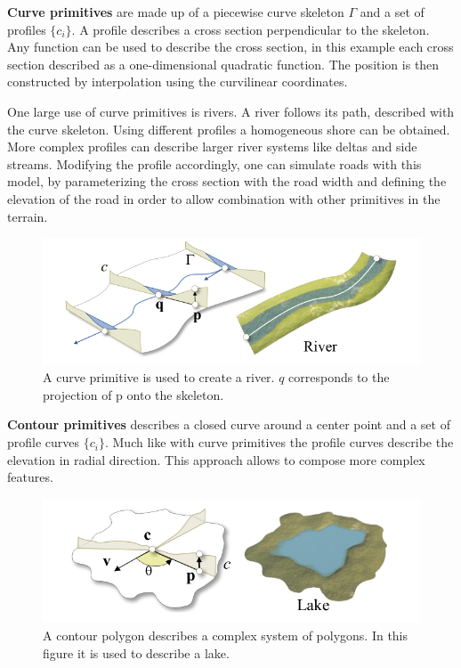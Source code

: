 \textbf{Curve primitives} are made up of a piecewise curve skeleton  $\Gamma$ and a set of profiles $\{c_i\}$. A profile describes a cross section perpendicular to the skeleton. Any function can be used to describe the cross section, in this example each cross section described as a one-dimensional quadratic function. The position is then constructed by interpolation using the curvilinear coordinates. 

One large use of curve primitives is rivers. A river follows its path, described with the curve skeleton. Using different profiles a homogeneous shore can be obtained. More complex profiles can describe larger river systems like deltas and side streams. 
Modifying the profile accordingly, one can simulate roads with this model, by parameterizing the cross section with the road width and defining the elevation of the road in order to allow combination with other primitives in the terrain.

\begin{figure}[htb]
	\centering
	\includegraphics[width=.8\linewidth]{GGP15/curve_primitive}
	\caption{A curve primitive is used to create a river. $q$ corresponds to the projection of p onto the skeleton.}
	\label{fig:curve_primitive}
\end{figure}

\textbf{Contour primitives} describes a closed curve around a center point and a set of profile curves $\{ c_i \}$. Much like with curve primitives the profile curves describe the elevation in radial direction. This approach allows to compose more complex features.

\begin{figure}[htb]
	\centering
	\includegraphics[width=.8\linewidth]{GGP15/contour_primitive}
	\caption{A contour polygon describes a complex system of polygons. In this figure it is used to describe a lake.}
	\label{fig:contour_primitive}
\end{figure}

